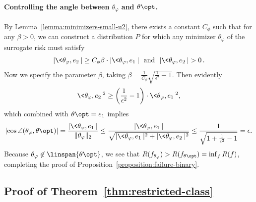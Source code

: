 \documentclass[11pt]{article}
\newcommand{\prn}[1]{\left({#1}\right)} %
\newcommand{\sloss}{\varphi}  %
\begin{document}
\paragraph{Controlling the angle between $\theta_\sloss$ and $\theta\opt$.}
By Lemma~\ref{lemma:minimizers-small-u2},
there exists a constant $C_\phi$ such that for any $\beta > 0$,
we can construct a distribution $P$ for which
any minimizer $\theta_\sloss$ of the surrogate risk must satisfy
\begin{align*}
  |\< \theta_\sloss, e_2 \> |
  \geq C_\phi \beta \cdot | \< \theta_\sloss, e_1 \> |
  ~~ \mbox{and} ~~ |\< \theta_\sloss, e_2 \> | > 0 \, .
\end{align*}
Now we specify the parameter $\beta$, taking $\beta =
\frac{1}{C_\phi} \sqrt{\frac{1}{\epsilon^2} - 1}$.
%
Then evidently
\begin{align*}
  \<\theta_\sloss, e_2 \>^2 \geq
  \prn{\frac{1}{\epsilon^2} - 1} \cdot \<\theta_\sloss, e_1 \>^2,
\end{align*}
which combined with $\theta\opt = e_1$ implies
\begin{equation*}
  \left|\cos \angle (\theta_\sloss, \theta\opt) \right|
  = \frac{| \< \theta_\sloss, e_1 \> |}{ \|\theta_\sloss\|_2}
  \leq \frac{|\<\theta_\sloss, e_1 \> |}{
    \sqrt{| \<\theta_\sloss, e_1 \> |^2 + | \<\theta_\sloss, e_2 \> |^2}}
  \leq \frac{1}{\sqrt{1 + \frac{1}{\epsilon^2} - 1}} = \epsilon.
\end{equation*}
Because $\theta_\sloss \not \in \linspan\{\theta\opt\}$, we see that
$R(f_{\theta_\sloss}) > R(f_{\theta\opt}) = \inf_f R(f)$, completing the
proof of Proposition~\ref{proposition:failure-binary}.

\subsection{Proof of Theorem~\ref{thm:restricted-class}}
\label{proof:restricted-class}

\newcommand{\gapfunc}{\wb{\psi}_\sloss}  %
\newcommand{\convgapfunc}{\psi_\sloss}  %
\newcommand{\simplex}{\mc{P}}  %
\end{document}
